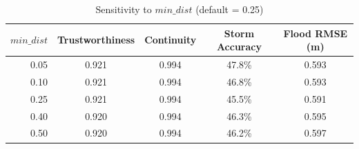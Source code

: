 \begin{table}[H]
\centering
\begin{tabular}{rcccc}
    \toprule
    $min\_dist$ & Trustworthiness & Continuity & Storm Accuracy & Flood RMSE (m) \\
    \midrule
    0.05 & 0.921 & 0.994 & 47.8\% & 0.593 \\
    0.10 & 0.921 & 0.994 & 46.8\% & 0.593 \\
    0.25 & 0.921 & 0.994 & 45.5\% & 0.591 \\
    0.40 & 0.920 & 0.994 & 46.3\% & 0.595 \\
    0.50 & 0.920 & 0.994 & 46.2\% & 0.597 \\
    \bottomrule
\end{tabular}
\caption{Sensitivity to $min\_dist$ (default = 0.25)}
\label{tab:sens_mindist}
\end{table}
